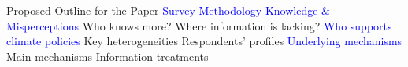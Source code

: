 

\begin{frame}{Proposed Outline for the Paper}
\bbs
\ip \textcolor{blue}{Survey Methodology}
\ip \textcolor{blue}{Knowledge \& Misperceptions} 
\bbs 
\ip Who knows more?
\ip Where information is lacking?
\ee
\ip \textcolor{blue}{Who supports climate policies} %
\bbs 
\ip Key heterogeneities
\ip Respondents' profiles
\ee
\ip \textcolor{blue}{Underlying mechanisms}
\bbs
\ip Main mechanisms
\ip Information treatments
\ee
\ee
\end{frame}

